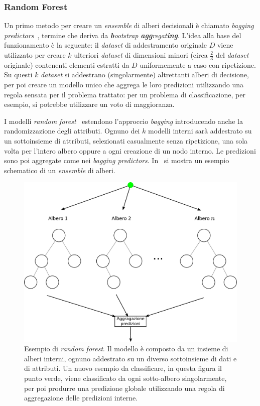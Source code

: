 \subsubsection{Random Forest}
Un primo metodo per creare un \emph{ensemble} di alberi decisionali è chiamato \emph{bagging predictors}~\cite{bagging_predictors}, termine che deriva da \emph{\textbf{b}ootstrap} \emph{\textbf{agg}regat\textbf{ing}}.
L'idea alla base del funzionamento è la seguente: il \emph{dataset} di addestramento originale $D$ viene utilizzato per creare $k$ ulteriori \emph{dataset} di dimensioni minori (circa $\frac{2}{3}$ del \emph{dataset} originale) contenenti elementi estratti da $D$ uniformemente a caso con ripetizione.
Su questi $k$ \emph{dataset} si addestrano (singolarmente) altrettanti alberi di decisione, per poi creare un modello unico che aggrega le loro predizioni utilizzando una regola sensata per il problema trattato: per un problema di classificazione, per esempio, si potrebbe utilizzare un voto di maggioranza.

I modelli \emph{random forest}~\cite{random_forest} estendono l'approccio \emph{bagging} introducendo anche la randomizzazione degli attributi. 
Ognuno dei $k$ modelli interni sarà addestrato su un sottoinsieme  di attributi, selezionati casualmente senza ripetizione, una sola volta per l'intero albero oppure a ogni creazione di un nodo interno.
Le predizioni sono poi aggregate come nei \emph{bagging predictors}.
In~ si mostra un esempio schematico di un \emph{ensemble} di alberi.

\begin{figure}
    \centering
    \includegraphics[width=0.7\linewidth]{img/random_forest.pdf}
    \caption[Esempio \emph{random forest}.]{Esempio di \emph{random forest}. Il modello è composto da un insieme di alberi interni, ognuno addestrato su un diverso sottoinsieme di dati e di attributi. Un nuovo esempio da classificare, in questa figura il punto verde, viene classificato da ogni sotto-albero singolarmente, per poi produrre una predizione globale utilizzando una regola di aggregazione delle predizioni interne.}
    \label{fig:random_forest}
\end{figure}

